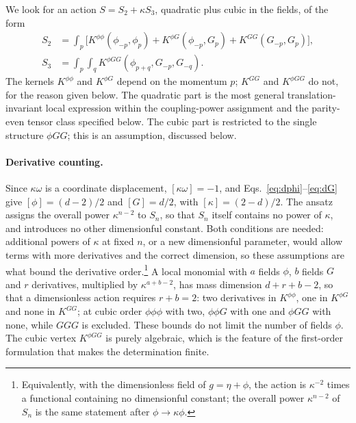 \documentclass[prd,aps,preprint,superscriptaddress,nofootinbib,amsmath,amssymb,eqsecnum]{revtex4-2}
\newcommand{\ip}[1]{\int_{#1}}
\providecommand{\DIFaddtex}[1]{{\protect\color{blue} \sf #1}} %
\providecommand{\DIFaddbegin}{} %
\providecommand{\DIFaddend}{} %
\providecommand{\DIFadd}[1]{\texorpdfstring{\DIFaddtex{#1}}{#1}} %
\begin{document}
We look for an action $S=S_2+\kappa S_3$, quadratic plus cubic in the fields, of the form
\begin{equation}
\begin{aligned}
S_2&=\ip{p}\Big[K^{\phi\phi}(\phi_{-p},\phi_p)+K^{\phi G}(\phi_{-p},G_p)+K^{GG}(G_{-p},G_p)\Big],\\
S_3&=\ip{p}\ip{q}K^{\phi GG}(\phi_{p+q},G_{-p},G_{-q}).
\end{aligned}
\label{eq:ansatz}
\end{equation}
The kernels $K^{\phi\phi}$ and $K^{\phi G}$ depend on the momentum $p$; $K^{GG}$ and
$K^{\phi GG}$ do not, for the reason given below.
The quadratic part is the most general translation-invariant local expression within the
coupling-power assignment and the parity-even tensor class specified below. The cubic part
is restricted to the single structure $\phi GG$; this is an assumption, discussed below.

\paragraph{Derivative counting.} Since $\kappa\omega$ is a coordinate displacement,
$[\kappa\omega]=-1$, and Eqs.~\eqref{eq:dphi}--\eqref{eq:dG} give $[\phi]=(d-2)/2$ and
$[G]=d/2$, with $[\kappa]=(2-d)/2$. The ansatz assigns the overall power $\kappa^{n-2}$ to $S_n$, so
that $S_n$ itself contains no power of $\kappa$, and introduces no other dimensionful
constant. Both conditions are needed: additional powers of $\kappa$ at fixed $n$, or a new
dimensionful parameter, would allow terms with more derivatives and the correct dimension,
so these assumptions are what bound the derivative order.\DIFaddbegin \footnote{\DIFadd{Equivalently, with the dimensionless
field of $g=\eta+\phi$, the action is $\kappa^{-2}$ times a functional containing no
dimensionful constant; the overall power $\kappa^{n-2}$ of $S_n$ is the same statement after
$\phi\to\kappa\phi$.}} \DIFaddend A local monomial with $a$ fields $\phi$, $b$
fields $G$ and $r$ derivatives, multiplied by $\kappa^{a+b-2}$, has mass dimension $d+r+b-2$,
so that a dimensionless action requires $r+b=2$: two derivatives in $K^{\phi\phi}$, one in
$K^{\phi G}$ and none in $K^{GG}$; at cubic order $\phi\phi\phi$ with two, $\phi\phi G$ with
one and $\phi GG$ with none, while $GGG$ is excluded. These bounds do not limit the number of
fields $\phi$. The cubic vertex $K^{\phi GG}$ is purely algebraic, which is the feature of the
first-order formulation that makes the determination finite.
\end{document}
